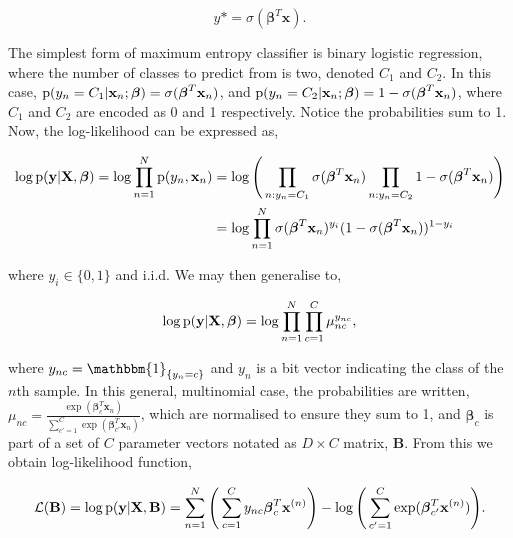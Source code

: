\begin{equation}
y* = \sigma(\boldsymbol\beta^T\mathbf{x}).
\label{eq:logisticprediction}
\end{equation}

The simplest form of maximum entropy classifier is binary logistic regression, where the number of classes to predict from is two, denoted $C_1$ and $C_2$. In this case, $\text{p}(y_n = C_1|\mathbf{x}_n;\boldsymbol\beta) = \sigma(\boldsymbol\beta^T\mathbf{x}_n)$, and $\text{p}(y_n = C_2|\mathbf{x}_n;\boldsymbol\beta) = 1 - \sigma(\boldsymbol\beta^T\mathbf{x}_n)$, where $C_1$ and $C_2$ are encoded as 0 and 1 respectively. Notice the probabilities sum to 1. Now, the log-likelihood can be expressed as,

\begin{equation}
\begin{aligned}
\log\text{p}(\mathbf{y}|\mathbf{X}, \boldsymbol\beta) = \log\prod_{n=1}^N \text{p}(y_n, \mathbf{x}_n)
&= \log\Bigg(\prod_{n:y_n = C_1} \sigma(\boldsymbol\beta^T\mathbf{x}_n) \prod_{n:y_n = C_2} 1 - \sigma(\boldsymbol\beta^T\mathbf{x}_n)\Bigg) \\
&=  \log\prod_{n = 1}^N \sigma(\boldsymbol\beta^T\mathbf{x}_n)^{y_i}(1 - \sigma(\boldsymbol\beta^T\mathbf{x}_n))^{1 - y_i}
\end{aligned}
\label{eq:logistic2}
\end{equation}

where $y_i \in \{0, 1\}$ and i.i.d. We may then generalise to,

\begin{equation}
\begin{aligned}
\log\text{p}(\mathbf{y}|\mathbf{X}, \boldsymbol\beta) = \log \prod_{n = 1}^N \prod_{c = 1}^C \mu_{nc}^{y_{nc}},
\end{aligned}
\label{eq:multinomial}
\end{equation}

where $y_{nc} = \mathbbm{1}_{\{y_n = c\}}$ and $y_n$ is a bit vector indicating the class of the $n$th sample. In this general, multinomial case, the probabilities are written, $\mu_{nc} = \frac{\exp(\boldsymbol\beta_c^T\mathbf{x}_n)}{\sum_{c' = 1}^C \exp(\boldsymbol\beta_{c'}^T\mathbf{x}_n)}$, which are normalised to ensure they sum to 1, and $\boldsymbol\beta_c$ is part of a set of $C$ parameter vectors notated as $D \times C$ matrix, $\mathbf{B}$. From this we obtain log-likelihood function,

\begin{equation}
\mathcal{L}(\mathbf{B}) = 
\log\text{p}(\mathbf{y}|\mathbf{X}, \mathbf{B}) = \sum_{n=1}^N  \Bigg( \sum_{c = 1}^C y_{nc}\boldsymbol\beta_c^T \mathbf{x}^{(n)} \Bigg) - \log \Bigg( \sum_{c' = 1}^C \exp(\boldsymbol\beta_{c'}^T\mathbf{x}^{(n)})\Bigg).
\label{eq:logisticcost}
\end{equation}

